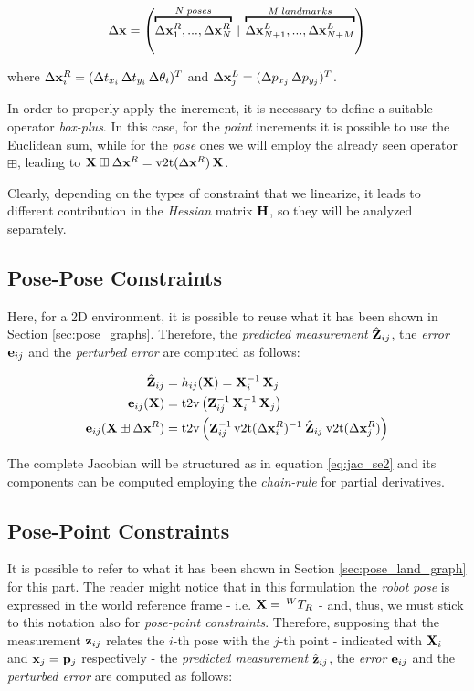 \begin{equation}
    \dx = \left(\overbracket{\dx^R_1, ..., \dx^R_N}^{N \;poses}\: |\: \overbracket{\dx^L_{N+1}, ..., \dx^L_{N+M}}^{M \;landmarks}\right)
    \label{eq:increments_ba_2d}
\end{equation}

\noindent where $\Delta \mathbf{x}^R_i = (\Delta t_{x_i}\, \Delta t_{y_i}\, \Delta \theta_i)^T$ and $\Delta \mathbf{x}^L_j = (\Delta p_{x_j}\, \Delta p_{y_j})^T$.

In order to properly apply the increment, it is necessary to define a suitable operator \textit{box-plus}. In this case, for the \textit{point} increments it is possible to use the Euclidean sum, while for the \textit{pose} ones we will employ the already seen operator $\boxplus$, leading to $\SState \boxplus \dx^R = \v2t(\dx^R)\, \SState$.

Clearly, depending on the types of constraint that we linearize, it leads to different contribution in the \textit{Hessian} matrix $\mathbf{H}$, so they will be analyzed separately.

\subsection{Pose-Pose Constraints}\label{subsec:pose_pose_constraints_2d}
Here, for a 2D environment, it is possible to reuse what it has been shown in Section \ref{sec:pose_graphs}. Therefore, the \textit{predicted measurement} $\hat{\mathbf{Z}}_{ij}$, the \textit{error} $\mathbf{e}_{ij}$ and the \textit{perturbed error} are computed as follows:

\begin{align*}
    \Pred_{ij} &= h_{ij}(\SState) = \SState_i^{-1}\, \SState_j \\
    \error_{ij}(\SState) &= \text{t2v}\left(\Meas_{ij}^{-1}\,\SState_i^{-1}\, \SState_j\right) \\
    \error_{ij}(\SState \boxplus \dx^R) &= \text{t2v}\left(\Meas_{ij}^{-1} \, \v2t(\dx^R_i)^{-1}\: \Pred_{ij} \:\v2t(\dx^R_j) \right)
\end{align*}

\noindent The complete Jacobian will be structured as in equation \ref{eq:jac_se2} and its components can be computed employing the \textit{chain-rule} for partial derivatives.

\subsection{Pose-Point Constraints}\label{subsec:pose_point_constraints_2d}
It is possible to refer to what it has been shown in Section \ref{sec:pose_land_graph} for this part. The reader might notice that in this formulation the \textit{robot pose} is expressed in the world reference frame - i.e. $\mathbf{X} =\, ^{W}T_{R}$ - and, thus, we must stick to this notation also for \textit{pose-point constraints}. Therefore, supposing that the measurement $\mathbf{z}_{ij}$ relates the $i$-th pose with the $j$-th point - indicated with $\mathbf{X}_i$ and $\mathbf{x}_j = \mathbf{p}_j$ respectively - the \textit{predicted measurement} $\hat{\mathbf{z}}_{ij}$, the \textit{error} $\mathbf{e}_{ij}$ and the \textit{perturbed error} are computed as follows:


